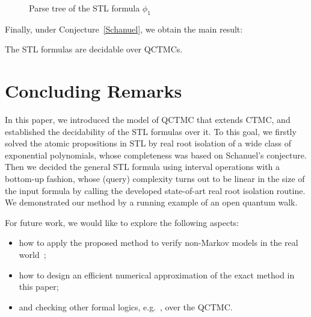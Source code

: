 \documentclass[a4paper,UKenglish,cleveref,autoref,thm-restate,authorcolumns]{lipics-v2019}
\newcommand{\I}{\mathcal{I}}
\newcommand{\ntl}{\mathrm{U}\,}
\newcommand{\mnt}{\mathrm{mnt}}
\newcommand{\true}{\texttt{true}}
\begin{document}
\begin{example}
\begin{figure}[ht]
	\caption{Parse tree of the STL formula $\phi_1$}\label{fig:parse}
\end{figure}

\end{example}

Finally, under Conjecture~\ref{Schanuel}, we obtain the main result:
\begin{theorem}
	The STL formulas are decidable over QCTMCs.
\end{theorem}


\section{Concluding Remarks}\label{S7}
In this paper, we introduced the model of QCTMC that extends CTMC,
and established the decidability of the STL formulas over it.
To this goal, we firstly solved the atomic propositions in STL
by real root isolation of a wide class of exponential polynomials,
whose completeness was based on Schanuel's conjecture.
Then we decided the general STL formula using interval operations with a bottom-up fashion,
whose (query) complexity turns out to be linear in the size of the input formula
by calling the developed state-of-art real root isolation routine.
We demonstrated our method by a running example of an open quantum walk.

For future work,
we would like to explore the following aspects:
\begin{itemize}
	\item how to apply the proposed method to verify non-Markov models in the real world~\cite{Pel14};
    \item how to design an efficient numerical approximation of the exact method in this paper;
    \item and checking other formal logics, e.g.~\cite{ASS+96}, over the QCTMC.
\end{itemize}



	
%	
		
\end{document}
